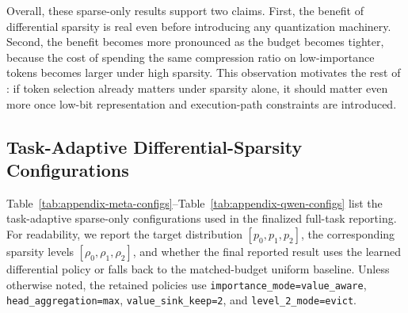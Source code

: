 \begin{table}[t]
\centering
\caption{Cross-model average sparse-only results on the six focal LongBench tasks. ``Differential'' denotes finalized full-task averages after applying the same conservative fallback-to-uniform rule.}
\label{tab:diff-sparsity-cross-model-updated}
\setlength{\tabcolsep}{5pt}
\end{table}

Overall, these sparse-only results support two claims.
First, the benefit of differential sparsity is real even before introducing any
quantization machinery.
Second, the benefit becomes more pronounced as the budget becomes tighter,
because the cost of spending the same compression ratio on low-importance tokens
becomes larger under high sparsity.
This observation motivates the rest of \method: if token selection already
matters under sparsity alone, it should matter even more once low-bit
representation and execution-path constraints are introduced.



\subsection{Task-Adaptive Differential-Sparsity Configurations}
\label{app:diffsparse-configs}

Table~\ref{tab:appendix-meta-configs}--Table~\ref{tab:appendix-qwen-configs}
list the task-adaptive sparse-only configurations used in the finalized
full-task reporting.
For readability, we report the target distribution
$[p_0,p_1,p_2]$, the corresponding sparsity levels
$[\rho_0,\rho_1,\rho_2]$, and whether the final reported result uses the learned
differential policy or falls back to the matched-budget uniform baseline.
Unless otherwise noted, the retained policies use
\texttt{importance\_mode=value\_aware},
\texttt{head\_aggregation=max},
\texttt{value\_sink\_keep=2}, and \texttt{level\_2\_mode=evict}.

